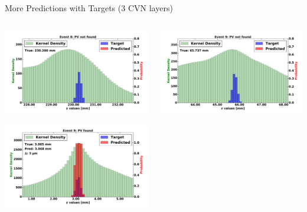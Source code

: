 \begin{frame}{More Predictions with Targets (3 CVN layers)}
  \begin{columns}[c]
        \begin{center}
            \includegraphics[width=1\textwidth,height=0.45\textwidth, trim=18 0 18 0]{images/120000_3layer_53.pdf}
    
            \includegraphics[width=1\textwidth, height=0.45\textwidth,trim=18 0 18 0]{images/120000_3layer_54.pdf}

        \end{center}
        \begin{center}
           \includegraphics[width=1\textwidth, height=0.45\textwidth, trim=18 0 18 0]{images/120000_3layer_55.pdf}
    

\end{center}
\end{columns}
\end{frame}
